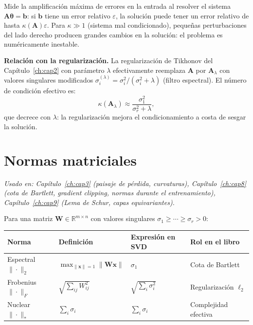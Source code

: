 Mide la amplificación máxima de errores en la entrada al resolver el sistema
$\bm{A}\bm{\theta} = \bm{b}$: si $\bm{b}$ tiene un error relativo $\varepsilon$,
la solución puede tener un error relativo de hasta $\kappa(\bm{A})\varepsilon$.
Para $\kappa \gg 1$ (sistema mal condicionado), pequeñas perturbaciones del
lado derecho producen grandes cambios en la solución: el problema es
numéricamente inestable.

\medskip\noindent\textbf{Relación con la regularización.} La regularización de
Tikhonov del Capítulo~\ref{ch:cap2} con parámetro $\lambda$ efectivamente
reemplaza $\bm{A}$ por $\bm{A}_\lambda$ con valores singulares modificados
$\sigma_i^{(\lambda)} = \sigma_i^2/(\sigma_i^2 + \lambda)$ (filtro espectral).
El número de condición efectivo es:
\[
  \kappa(\bm{A}_\lambda) \approx \frac{\sigma_1^2}{\sigma_r^2 + \lambda},
\]
que decrece con $\lambda$: la regularización mejora el condicionamiento a costa
de sesgar la solución.

\section{Normas matriciales}
\label{sec:ap_normas}

\textit{Usado en: Capítulo~\ref{ch:cap3} (paisaje de pérdida, curvaturas),
Capítulo~\ref{ch:cap8} (cota de Bartlett, gradient clipping, normas durante el
entrenamiento), Capítulo~\ref{ch:cap9} (Lema de Schur, capas equivariantes).}

\medskip
Para una matriz $\bm{W}\in\mathbb{R}^{m\times n}$ con valores singulares
$\sigma_1\geq\cdots\geq\sigma_r > 0$:

\begin{center}
\begin{tabular}{llll}
\toprule
\textbf{Norma} & \textbf{Definición} & \textbf{Expresión en SVD} & \textbf{Rol en el libro} \\
\midrule
Espectral $\|\cdot\|_2$ & $\max_{\|\bm{x}\|=1}\|\bm{W}\bm{x}\|$ & $\sigma_1$ & Cota de Bartlett \\
Frobenius $\|\cdot\|_F$ & $\sqrt{\sum_{ij}W_{ij}^2}$ & $\sqrt{\sum_i\sigma_i^2}$ & Regularización $\ell_2$ \\
Nuclear $\|\cdot\|_*$ & $\sum_i\sigma_i$ & $\sum_i\sigma_i$ & Complejidad efectiva \\
\bottomrule
\end{tabular}
\end{center}

